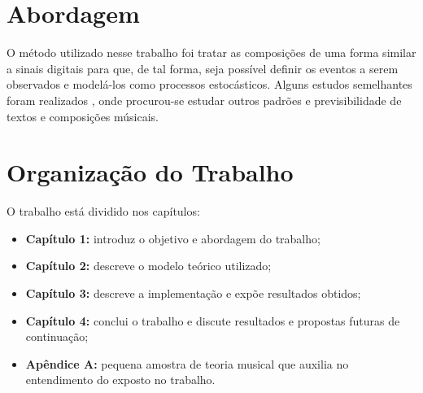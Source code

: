 \section{Abordagem}

O método utilizado nesse trabalho foi tratar as composições de uma forma similar a sinais digitais para que, de tal forma, seja possível definir os eventos a serem observados e modelá-los como processos estocásticos. Alguns estudos semelhantes foram realizados \cite{artigomit}, onde procurou-se estudar outros padrões e previsibilidade de textos e composições músicais.

\section{Organização do Trabalho}

O trabalho está dividido nos capítulos:

\begin{itemize}
    \item \textbf{Capítulo 1:} introduz o objetivo e abordagem do trabalho;
    \item \textbf{Capítulo 2:} descreve o modelo teórico utilizado;
    \item \textbf{Capítulo 3:} descreve a implementação e expõe resultados obtidos;
    \item \textbf{Capítulo 4:} conclui o trabalho e discute resultados e propostas futuras de continuação;
    \item \textbf{Apêndice A:} pequena amostra de teoria musical que auxilia no entendimento do exposto no trabalho.
\end{itemize}

    